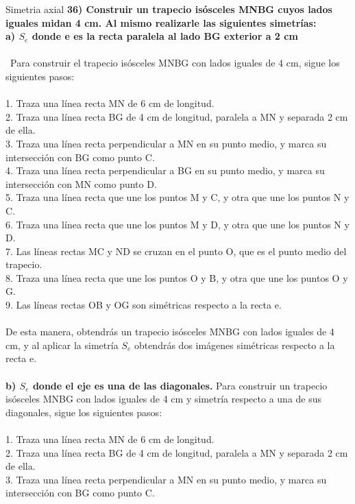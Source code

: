 \documentclass{article}
\begin{document}
{\large Simetria axial}
{\bf 36) Construir un trapecio isósceles MNBG cuyos lados iguales midan 4 cm. Al mismo realizarle las siguientes simetrías:} \\
{\bf a) $S_e$ donde e es la recta paralela al lado BG exterior a 2 cm } \\ \\\ 
Para construir el trapecio isósceles MNBG con lados iguales de 4 cm, sigue los siguientes pasos:\\
\\
1. Traza una línea recta MN de 6 cm de longitud.\\
2. Traza una línea recta BG de 4 cm de longitud, paralela a MN y separada 2 cm de ella.\\
3. Traza una línea recta perpendicular a MN en su punto medio, y marca su intersección con BG como punto C.\\
4. Traza una línea recta perpendicular a BG en su punto medio, y marca su intersección con MN como punto D.\\
5. Traza una línea recta que une los puntos M y C, y otra que une los puntos N y C.\\
6. Traza una línea recta que une los puntos M y D, y otra que une los puntos N y D.\\
7. Las líneas rectas MC y ND se cruzan en el punto O, que es el punto medio del trapecio.\\
8. Traza una línea recta que une los puntos O y B, y otra que une los puntos O y G.\\
9. Las líneas rectas OB y OG son simétricas respecto a la recta e.\\
\\
De esta manera, obtendrás un trapecio isósceles MNBG con lados iguales de 4 cm, y al aplicar la simetría $S_e$ obtendrás dos imágenes simétricas respecto a la recta e.\\
\\
{\bf b) $S_e$ donde el eje es una de las diagonales.}
Para construir un trapecio isósceles MNBG con lados iguales de 4 cm y simetría respecto a una de sus diagonales, sigue los siguientes pasos:\\
\\
1. Traza una línea recta MN de 6 cm de longitud.\\
2. Traza una línea recta BG de 4 cm de longitud, paralela a MN y separada 2 cm de ella.\\
3. Traza una línea recta perpendicular a MN en su punto medio, y marca su intersección con BG como punto C.\\
\end{document}
